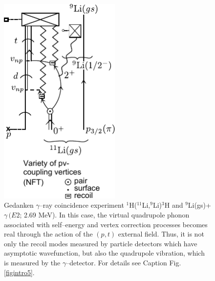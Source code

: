           \begin{figure}
          \centerline {
          \includegraphics*[width=6cm]{introduccion/figs/figintro6xx}
          }
          \caption{Gedanken $\gamma$--ray coincidence experiment $^1$H($^{11}$Li,$^9$Li)$^3$H and $^9$Li(gs)+$\gamma\, (E2$; 2.69 MeV). In  this case, the virtual quadrupole phonon associated with self--energy and vertex correction processes becomes real through the action of the $(p,t)$ external field. Thus, it is not only the recoil modes measured by particle detectors which have  asymptotic wavefunction, but also the quadrupole vibration, which is measured by the $\gamma$--detector. For details see Caption Fig. \ref{figintro5}.}
          \label{figintro6x}
          \end{figure}

